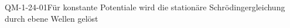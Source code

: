 
\begin{REM}{QM-1-24-01}{Für konstante Potentiale wird die stationäre Schrödingergleichung durch ebene Wellen gelöst}
\end{REM}

